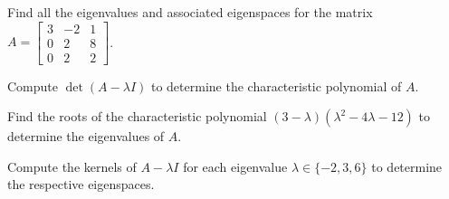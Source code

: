 \begin{applicationActivities}{3}{27}
\begin{activity}{15}
  Find all the eigenvalues and associated eigenspaces for the matrix $A=\begin{bmatrix} 3 & -2 & 1 \\  0 & 2 & 8 \\ 0 & 2 & 2 \end{bmatrix}$.

\begin{subactivity}
 Compute $\det (A-\lambda I)$ to determine the characteristic polynomial of $A$.
\end{subactivity}
\begin{subactivity}
Find the roots of the characteristic polynomial
\((3-\lambda)(\lambda^2-4\lambda-12)\)
to determine the eigenvalues of $A$.
\end{subactivity}
\begin{subactivity}
Compute the kernels of $A-\lambda I$ for each eigenvalue
$\lambda\in\{-2,3,6\}$ to determine the respective eigenspaces.
\end{subactivity}
\end{activity}

\end{applicationActivities}

